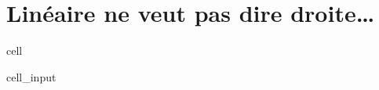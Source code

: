 \documentclass[letterpaper,10pt,french]{sphinxmanual}
\begin{document}
\section{Linéaire ne veut pas dire droite…}
\label{\detokenize{TP_Regression_Lineaire:lineaire-ne-veut-pas-dire-droite}}
\begin{sphinxuseclass}{cell}
\begin{sphinxuseclass}{cell_input}
\begin{sphinxVerbatim}[commandchars=\\\{\}]
 
 
\end{sphinxVerbatim}

\end{sphinxuseclass}
\end{sphinxuseclass}
\end{document}
